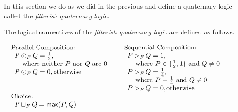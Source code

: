 \documentclass{llncs}
\begin{document}
In this section we do as we did in the previous and define a
quaternary logic called the \emph{filterish quaternary logic}.
\begin{definition}
  \label{def:filterish-semantics}
  The logical connectives of the \emph{filterish quaternary logic} are
  defined as follows:\vspace{-5px}
  \begin{center}
    \begin{math}
      \setlength{\arraycolsep}{5px}
      \begin{array}{lll}
        \begin{array}{lll}
          \text{Parallel Composition:}\\
          \begin{array}{lll}
            P \odot_F Q = \half,\\
            \,\,\,\,\,\,\,\text{where neither $P$ nor $Q$ are $0$}\\
            P \odot_F Q = 0, \text{otherwise}\\\\\\
          \end{array}
        \end{array}
        &
        \begin{array}{lll}
          \text{Sequential Composition:}\\
          \begin{array}{lll}          
            P \rhd_F Q = 1,\\
            \,\,\,\,\,\,\,\text{where } P \in \{\half, 1\} \text{ and } Q \neq 0\\
            P \rhd_F Q = \forth,\\
            \,\,\,\,\,\,\,\text{where } P = \forth  \text{ and } Q \neq 0\\
            P \rhd_F Q = 0, \text{otherwise}
          \end{array}
        \end{array}
        \\[30px]
        \begin{array}{lll}
          \text{Choice:}\\    
          \begin{array}{lll}
            P \sqcup_F Q = \mathsf{max}(P,Q)
          \end{array}
        \end{array}
      \end{array}
    \end{math}
  \end{center}        
\end{definition}
\end{document}
